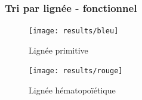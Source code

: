 \documentclass[fleqn,11pt]{SelfArx} %
\begin{document}
%


\subsubsection{Tri par lignée - fonctionnel}

%


\begin{figure}[ht]
\centering
\texttt{[image: results/bleu]}
\caption{Lignée primitive}
\label{fig:PS}
\end{figure}

\begin{figure}[ht]
\centering
\texttt{[image: results/rouge]}
\caption{Lignée hématopoïétique}
\label{fig:4SG}
\end{figure}
\end{document}
